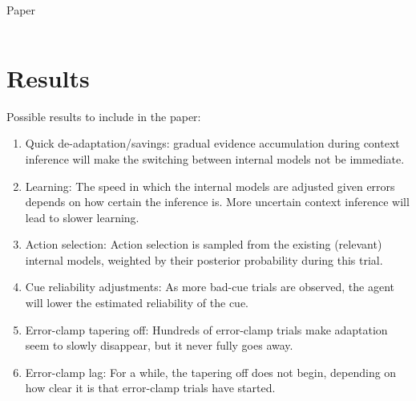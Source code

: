 \documentclass{report}
\begin{document}
\begin{chapter}{Paper}
\begin{tabularx}{\textwidth}{
  l|
  >{\hsize=0.4\hsize\linewidth=\hsize}X|
  >{\hsize=0.2\hsize\linewidth=\hsize}X|
  >{\hsize=0.2\hsize\linewidth=\hsize}X}
\end{tabularx}

\section{Results}
Possible results to include in the paper:
\begin{enumerate}
\item Quick de-adaptation/savings: gradual evidence accumulation during context inference will make the switching between internal models not be immediate.
\item Learning: The speed in which the internal models are adjusted given errors depends on how certain the inference is. More uncertain context inference will lead to slower learning.
\item Action selection: Action selection is sampled from the existing (relevant) internal models, weighted by their posterior probability during this trial.
\item Cue reliability adjustments: As more bad-cue trials are observed, the agent will lower the estimated reliability of the cue.
\item Error-clamp tapering off: Hundreds of error-clamp trials make adaptation seem to slowly disappear, but it never fully goes away.
\item Error-clamp lag: For a while, the tapering off does not begin, depending on how clear it is that error-clamp trials have started.
\end{enumerate}




\end{chapter}

\end{document}
